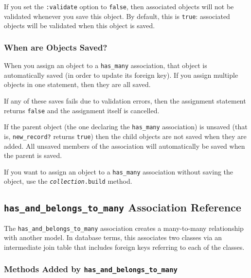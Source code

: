 \documentclass[10pt]{book}
\begin{document}
If you set the \texttt{:validate} option to \texttt{false}, then associated objects will not be validated whenever you save this object. By default, this is \texttt{true}: associated objects will be validated when this object is saved.

\subsubsection{ When are Objects Saved?}

When you assign an object to a \texttt{has\_many} association, that  object is automatically saved (in order to update its foreign key). If  you assign multiple objects in one statement, then they are all saved.

If any of these saves fails due to validation errors, then the assignment statement returns \texttt{false} and the assignment itself is cancelled.

If the parent object (the one declaring the \texttt{has\_many} association) is unsaved (that is, \texttt{new\_record?} returns \texttt{true})  then the child objects are not saved when they are added. All unsaved  members of the association will automatically be saved when the parent  is saved.

If you want to assign an object to a \texttt{has\_many} association without saving the object, use the \texttt{\emph{collection}.build} method.

\subsection{ \texttt{has\_and\_belongs\_to\_many} Association Reference}

The \texttt{has\_and\_belongs\_to\_many} association creates a  many-to-many relationship with another model. In database terms, this  associates two classes via an intermediate join table that includes  foreign keys referring to each of the classes.

\subsubsection{ Methods Added by \texttt{has\_and\_belongs\_to\_many}}
\end{document}
